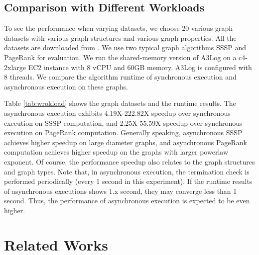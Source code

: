 \subsection{Comparison with Different Workloads}
\label{sec:expr:workloads}
To see the performance when varying datasets, we choose 20 various graph datasets with various graph structures and various graph properties. All the datasets are downloaded from \cite{konect}. We use two typical graph algorithms SSSP and PageRank for evaluation. We run the shared-memory version of A3Log on a c4-2xlarge EC2 instance with 8 vCPU and 60GB memory. A3Log is configured with 8 threads. We compare the algorithm runtime of synchronous execution and asynchronous execution on these graphs.

Table \ref{tab:wrokload} shows the graph datasets and the runtime results. The asynchronous execution exhibits 4.19X-222.82X speedup over synchronous execution on SSSP computation, and 2.25X-55.59X speedup over synchronous execution on PageRank computation. Generally speaking, asynchronous SSSP achieves higher speedup on large diameter graphs, and asynchronous PageRank computation achieves higher speedup on the graphs with larger powerlaw exponent. Of course, the performance speedup also relates to the graph structures and graph types. Note that, in asynchronous execution, the termination check is performed periodically (every 1 second in this experiment). If the runtime results of asynchronous executions shows 1.x second, they may converge less than 1 second. Thus, the performance of asynchronous execution is expected to be even higher.

\section{Related Works}
\label{sec:related}

